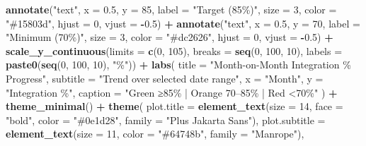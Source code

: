 \documentclass[
]{article}
\newenvironment{Shaded}{\begin{snugshade}}{\end{snugshade}}
\newcommand{\AttributeTok}[1]{\textcolor[rgb]{0.13,0.29,0.53}{#1}}
\newcommand{\DecValTok}[1]{\textcolor[rgb]{0.00,0.00,0.81}{#1}}
\newcommand{\FloatTok}[1]{\textcolor[rgb]{0.00,0.00,0.81}{#1}}
\newcommand{\FunctionTok}[1]{\textcolor[rgb]{0.13,0.29,0.53}{\textbf{#1}}}
\newcommand{\NormalTok}[1]{#1}
\newcommand{\SpecialCharTok}[1]{\textcolor[rgb]{0.81,0.36,0.00}{\textbf{#1}}}
\newcommand{\StringTok}[1]{\textcolor[rgb]{0.31,0.60,0.02}{#1}}
\begin{document}
\begin{Shaded}
\begin{Highlighting}[]
        \FunctionTok{annotate}\NormalTok{(}\StringTok{"text"}\NormalTok{, }\AttributeTok{x =} \FloatTok{0.5}\NormalTok{, }\AttributeTok{y =} \DecValTok{85}\NormalTok{, }\AttributeTok{label =} \StringTok{"Target (85\%)"}\NormalTok{, }\AttributeTok{size =} \DecValTok{3}\NormalTok{, }\AttributeTok{color =} \StringTok{"\#15803d"}\NormalTok{, }\AttributeTok{hjust =} \DecValTok{0}\NormalTok{, }\AttributeTok{vjust =} \SpecialCharTok{{-}}\FloatTok{0.5}\NormalTok{) }\SpecialCharTok{+}
        \FunctionTok{annotate}\NormalTok{(}\StringTok{"text"}\NormalTok{, }\AttributeTok{x =} \FloatTok{0.5}\NormalTok{, }\AttributeTok{y =} \DecValTok{70}\NormalTok{, }\AttributeTok{label =} \StringTok{"Minimum (70\%)"}\NormalTok{, }\AttributeTok{size =} \DecValTok{3}\NormalTok{, }\AttributeTok{color =} \StringTok{"\#dc2626"}\NormalTok{, }\AttributeTok{hjust =} \DecValTok{0}\NormalTok{, }\AttributeTok{vjust =} \SpecialCharTok{{-}}\FloatTok{0.5}\NormalTok{) }\SpecialCharTok{+}
        \FunctionTok{scale\_y\_continuous}\NormalTok{(}\AttributeTok{limits =} \FunctionTok{c}\NormalTok{(}\DecValTok{0}\NormalTok{, }\DecValTok{105}\NormalTok{), }\AttributeTok{breaks =} \FunctionTok{seq}\NormalTok{(}\DecValTok{0}\NormalTok{, }\DecValTok{100}\NormalTok{, }\DecValTok{10}\NormalTok{), }\AttributeTok{labels =} \FunctionTok{paste0}\NormalTok{(}\FunctionTok{seq}\NormalTok{(}\DecValTok{0}\NormalTok{, }\DecValTok{100}\NormalTok{, }\DecValTok{10}\NormalTok{), }\StringTok{"\%"}\NormalTok{)) }\SpecialCharTok{+}
        \FunctionTok{labs}\NormalTok{(}
          \AttributeTok{title =} \StringTok{"Month{-}on{-}Month Integration \% Progress"}\NormalTok{,}
          \AttributeTok{subtitle =} \StringTok{"Trend over selected date range"}\NormalTok{,}
          \AttributeTok{x =} \StringTok{"Month"}\NormalTok{,}
          \AttributeTok{y =} \StringTok{"Integration \%"}\NormalTok{,}
          \AttributeTok{caption =} \StringTok{"Green ≥85\% | Orange 70–85\% | Red \textless{}70\%"}
\NormalTok{        ) }\SpecialCharTok{+}
        \FunctionTok{theme\_minimal}\NormalTok{() }\SpecialCharTok{+}
        \FunctionTok{theme}\NormalTok{(}
          \AttributeTok{plot.title =} \FunctionTok{element\_text}\NormalTok{(}\AttributeTok{size =} \DecValTok{14}\NormalTok{, }\AttributeTok{face =} \StringTok{"bold"}\NormalTok{, }\AttributeTok{color =} \StringTok{"\#0e1d28"}\NormalTok{, }\AttributeTok{family =} \StringTok{"Plus Jakarta Sans"}\NormalTok{),}
          \AttributeTok{plot.subtitle =} \FunctionTok{element\_text}\NormalTok{(}\AttributeTok{size =} \DecValTok{11}\NormalTok{, }\AttributeTok{color =} \StringTok{"\#64748b"}\NormalTok{, }\AttributeTok{family =} \StringTok{"Manrope"}\NormalTok{),}

\end{Highlighting}
\end{Shaded}
\end{document}
